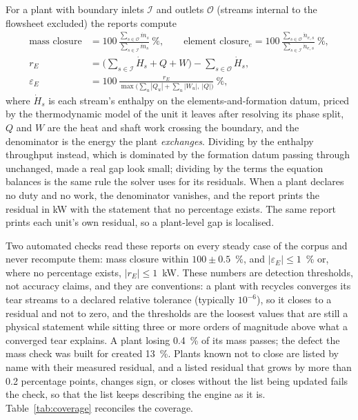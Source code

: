 \documentclass[preprint,12pt]{elsarticle}
\begin{document}
For a plant with boundary inlets $\mathcal{I}$ and outlets $\mathcal{O}$
(streams internal to the flowsheet excluded) the reports compute
\begin{align}
\text{mass closure} &= 100\,\frac{\sum_{s\in\mathcal{O}} \dot m_s}
                                    {\sum_{s\in\mathcal{I}} \dot m_s}\ \%,
\qquad
\text{element closure}_e = 100\,\frac{\sum_{s\in\mathcal{O}} \dot n_{e,s}}
                                    {\sum_{s\in\mathcal{I}} \dot n_{e,s}}\ \%,
\label{eq:mass}\\
r_E &= \Big(\sum_{s\in\mathcal{I}} \dot H_s + Q + W\Big)
       - \sum_{s\in\mathcal{O}} \dot H_s,
\label{eq:energy}\\
\varepsilon_E &= 100\,\frac{r_E}{\max\big(\sum_u |Q_u| + \sum_u |W_u|,\ |Q|\big)}\ \%,
\label{eq:energypct}
\end{align}
where $\dot H_s$ is each stream's enthalpy on the elements-and-formation
datum, priced by the thermodynamic model of the unit it leaves after
resolving its phase split, $Q$ and $W$ are the heat and shaft work crossing
the boundary, and the denominator is the energy the plant
\emph{exchanges}.  Dividing by the enthalpy throughput instead, which is
dominated by the formation datum passing through unchanged, made a real
gap look small; dividing by the terms the equation balances is the same
rule the solver uses for its residuals.  When a plant declares no duty and
no work, the denominator vanishes, and the report prints the residual in
kW with the statement that no percentage exists.  The same report prints
each unit's own residual, so a plant-level gap is localised.

Two automated checks read these reports on every steady case of the corpus
and never recompute them: mass closure within $100\pm0.5$~\%, and
$|\varepsilon_E|\le 1$~\% or, where no percentage exists,
$|r_E|\le 1$~kW.  These numbers are detection thresholds, not accuracy
claims, and they are conventions: a plant with recycles converges its tear
streams to a declared relative tolerance (typically $10^{-6}$), so it
closes to a residual and not to zero, and the thresholds are the loosest
values that are still a physical statement while sitting three or more
orders of magnitude above what a converged tear explains.  A plant losing
0.4~\% of its mass passes; the defect the mass check was built for created
13~\%.  Plants known not to close are listed by name with their measured
residual, and a listed residual that grows by more than 0.2 percentage
points, changes sign, or closes without the list being updated fails the
check, so that the list keeps describing the engine as it is.
Table~\ref{tab:coverage} reconciles the coverage.
\end{document}
